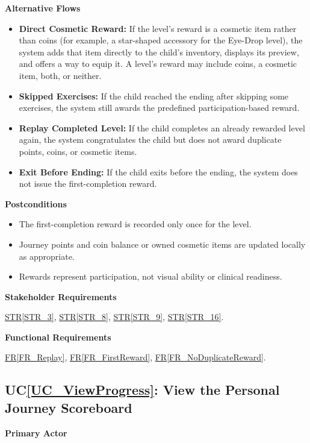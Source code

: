 \documentclass[10pt]{article}
\newcommand{\strref}[1]{\hyperref[#1]{STR\ref*{#1}}}
\newcounter{ucnum} %
\newcommand{\ucheading}[1]{UC\ref*{#1}}
\newcommand{\rref}[1]{\hyperref[#1]{FR\ref*{#1}}}
\begin{document}
\textbf{Alternative Flows}
\begin{itemize}
    \item \textbf{Direct Cosmetic Reward:} If the level's reward is
    a cosmetic item rather than coins (for example, a star-shaped
    accessory for the Eye-Drop level), the system adds that item
    directly to the child's inventory, displays its preview, and
    offers a way to equip it. A level's reward may include coins, a
    cosmetic item, both, or neither.
    \item \textbf{Skipped Exercises:} If the child reached the ending
    after skipping some exercises, the system still awards the
    predefined participation-based reward.
    \item \textbf{Replay Completed Level:} If the child completes an
    already rewarded level again, the system congratulates the child
    but does not award duplicate points, coins, or cosmetic items.
    \item \textbf{Exit Before Ending:} If the child exits before the
    ending, the system does not issue the first-completion reward.
\end{itemize}

\textbf{Postconditions}
\begin{itemize}
    \item The first-completion reward is recorded only once for
    the level.
    \item Journey points and coin balance or owned cosmetic items
    are updated locally as appropriate.
    \item Rewards represent participation, not visual ability
    or clinical readiness.
\end{itemize}

\textbf{Stakeholder Requirements}

\strref{STR_3}, \strref{STR_8}, \strref{STR_9}, \strref{STR_16}.

\textbf{Functional Requirements}

\rref{FR_Replay}, \rref{FR_FirstReward}, \rref{FR_NoDuplicateReward}.

\label{UC_ViewProgress}
\subsection{\ucheading{UC_ViewProgress}: View the Personal Journey Scoreboard}

\textbf{Primary Actor}
\end{document}
